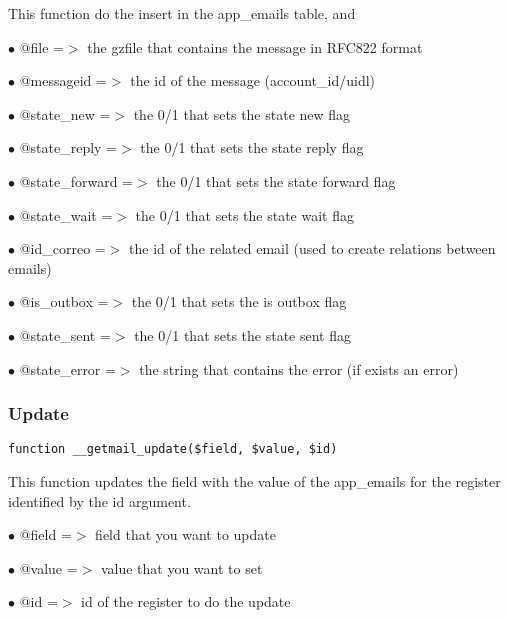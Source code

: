 \documentclass[a4paper]{article}
\begin{document}
This function do the insert in the app\_emails table, and

\begin{compactitem}
\item[\color{myblue}$\bullet$] @file          =$>$ the gzfile that contains the message in RFC822 format
\item[\color{myblue}$\bullet$] @messageid     =$>$ the id of the message (account\_id/uidl)
\item[\color{myblue}$\bullet$] @state\_new     =$>$ the 0/1 that sets the state new flag
\item[\color{myblue}$\bullet$] @state\_reply   =$>$ the 0/1 that sets the state reply flag
\item[\color{myblue}$\bullet$] @state\_forward =$>$ the 0/1 that sets the state forward flag
\item[\color{myblue}$\bullet$] @state\_wait    =$>$ the 0/1 that sets the state wait flag
\item[\color{myblue}$\bullet$] @id\_correo     =$>$ the id of the related email (used to create relations between emails)
\item[\color{myblue}$\bullet$] @is\_outbox     =$>$ the 0/1 that sets the is outbox flag
\item[\color{myblue}$\bullet$] @state\_sent    =$>$ the 0/1 that sets the state sent flag
\item[\color{myblue}$\bullet$] @state\_error   =$>$ the string that contains the error (if exists an error)
\end{compactitem}

\hypertarget{toc51}{}
\subsubsection{Update}

\begin{lstlisting}
function __getmail_update($field, $value, $id)
\end{lstlisting}

This function updates the field with the value of the app\_emails for the
register identified by the id argument.

\begin{compactitem}
\item[\color{myblue}$\bullet$] @field =$>$ field that you want to update
\item[\color{myblue}$\bullet$] @value =$>$ value that you want to set
\item[\color{myblue}$\bullet$] @id    =$>$ id of the register to do the update
\end{compactitem}
\end{document}
